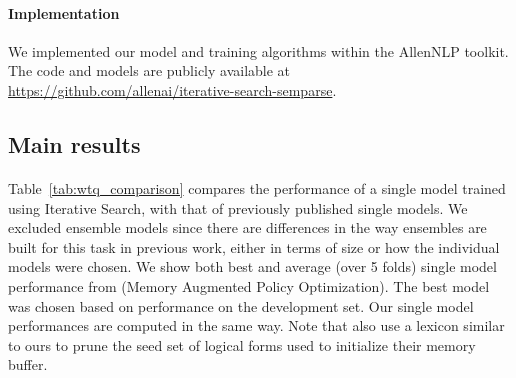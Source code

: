 \paragraph{Implementation} We implemented our model and training algorithms within the AllenNLP \citep{Gardner2018AllenNLPAD} toolkit. The code and models are publicly available at \url{https://github.com/allenai/iterative-search-semparse}.

\subsection{Main results}\label{sec:main_results}
\paragraph{\WTQ{}}Table~\ref{tab:wtq_comparison} compares the performance of a single model trained using Iterative Search, with that of previously published single models. We excluded ensemble models since there are differences in the way ensembles are built for this task in previous work, either in terms of size or how the individual models were chosen. We show both best and average (over 5 folds) single model performance from \citet{liang2018memory} (Memory Augmented Policy Optimization). The best model was chosen based on performance on the development set. Our single model performances are computed in the same way. Note that \citet{liang2018memory} also use a lexicon similar to ours to prune the seed set of logical forms used to initialize their memory buffer.

